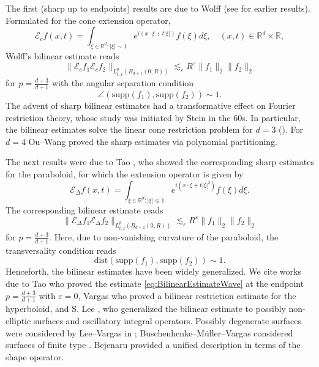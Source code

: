 \documentclass{amsart}
\theoremstyle{definition}
\newcommand{\R}{\mathbb{R}}
\begin{document}
The first (sharp up to endpoints) results are due to Wolff \cite{Wolff01} (see \cite{Bourgain1995,TaoVargasVega1998} for earlier results). Formulated for the cone extension operator,
\begin{equation*}
\mathcal{E}_c f(x,t) = \int_{\xi \in \R^d: |\xi| \sim 1} e^{i(x \cdot \xi + t |\xi|)} f(\xi) d\xi, \quad (x,t) \in \R^d \times \R,
\end{equation*}
Wolff's bilinear estimate reads
\begin{equation}
\label{eq:BilinearEstimateWave}
\| \mathcal{E}_c f_1 \mathcal{E}_c f_2 \|_{L^p_{t,x}(B_{d+1}(0,R))} \lesssim_\varepsilon R^\varepsilon \| f_1 \|_2 \| f_2 \|_2 
\end{equation}
for $p = \frac{d+3}{d+1}$ with the angular separation condition
\begin{equation}
\label{eq:AngularSeparationIntro}
\angle ( \text{supp}(f_1), \text{supp}(f_2)) \sim 1.
\end{equation}
The advent of sharp bilinear estimates had a transformative effect on Fourier restriction theory, whose study was initiated by Stein in the 60s.  In particular, the bilinear estimates solve the linear cone restriction problem for $d=3$ (\cite{Wolff01}). For $d=4$ Ou--Wang \cite{OuWang2022} proved the sharp estimates via polynomial partitioning.

\smallskip

 The next results were due to Tao \cite{Tao03}, who  showed the corresponding sharp estimates for the paraboloid, for which the extension operator is given by
\begin{equation*}
\mathcal{E}_{\Delta} f(x,t) = \int_{\xi \in \R^d: |\xi| \leq 1} e^{i(x \cdot \xi + t |\xi|^2)} f(\xi) d\xi.
\end{equation*}
The corresponding bilinear estimate reads
\begin{equation*}
\| \mathcal{E}_{\Delta} f_1 \mathcal{E}_{\Delta} f_2 \|_{L^p_{t,x}(B_{d+1}(0,R))} \lesssim_\varepsilon R^{\varepsilon} \| f_1 \|_2 \| f_2 \|_2
\end{equation*}
for $p=\frac{d+3}{d+1}$. Here, due to non-vanishing curvature of the paraboloid, the transversality condition reads
\begin{equation*}
\text{dist}( \text{supp}(f_1), \text{supp}(f_2)) \sim 1.
\end{equation*}
Henceforth, the bilinear estimates have been widely generalized. We cite works due to Tao \cite{Tao2001} who proved the estimate \eqref{eq:BilinearEstimateWave} at the endpoint $p=\frac{d+3}{d+1}$ with $\varepsilon = 0$, Vargas \cite{Vargas2005} who proved a bilinear restriction estimate for the hyperboloid, and S. Lee \cite{Lee2006DifferentSignsCurvature,Lee2006}, who generalized the bilinear estimate to possibly non-elliptic surfaces and oscillatory integral operators. Possibly degenerate surfaces were considered by Lee--Vargas in \cite{LeeVargas2010}; Buschenhenke--M\"uller--Vargas considered surfaces of finite type \cite{BuschenhenkeMuellerVargas2017}. Bejenaru \cite{Bejenaru2017} provided a unified description in terms of the shape operator.
\end{document}
